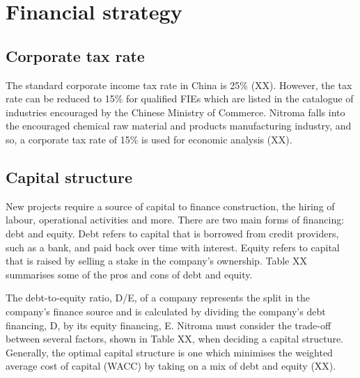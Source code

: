 \section{Financial strategy}
\subsection{Corporate tax rate}
\label{sec:tax}
The standard corporate income tax rate in China is 25\% (XX). However, the tax rate can be reduced to 15\% for qualified FIEs which are listed in the catalogue of industries encouraged by the Chinese Ministry of Commerce. Nitroma falls into the encouraged chemical raw material and products manufacturing industry, and so, a corporate tax rate of 15\% is used for economic analysis (XX).

\subsection{Capital structure}
\label{sec:de-ratio}
New projects require a source of capital to finance construction, the hiring of labour, operational activities and more. There are two main forms of financing: debt and equity. Debt refers to capital that is borrowed from credit providers, such as a bank, and paid back over time with interest. Equity refers to capital that is raised by selling a stake in the company’s ownership. Table XX summarises some of the pros and cons of debt and equity.

The debt-to-equity ratio, D/E, of a company represents the split in the company’s finance source and is calculated by dividing the company’s debt financing, D, by its equity financing, E. Nitroma must consider the trade-off between several factors, shown in Table XX, when deciding a capital structure. Generally, the optimal capital structure is one which minimises the weighted average cost of capital (WACC) by taking on a mix of debt and equity (XX).

